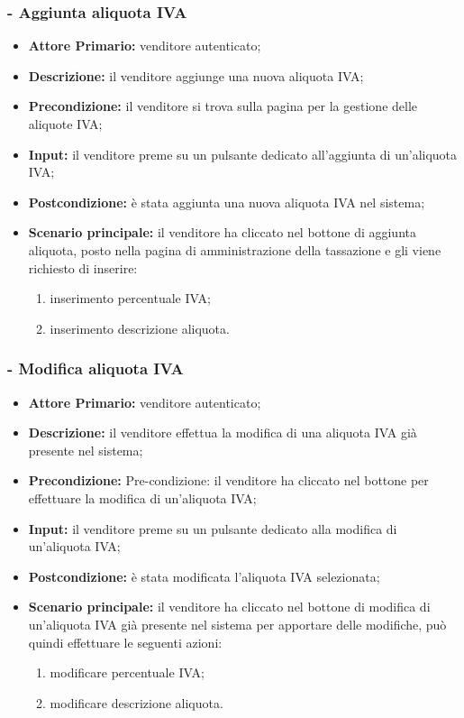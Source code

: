 \subsubsection{- Aggiunta aliquota IVA}
\begin{itemize}
    \item \textbf{Attore Primario:} venditore autenticato;
    \item \textbf{Descrizione:} il venditore aggiunge una nuova aliquota IVA;
    \item \textbf{Precondizione:} il venditore si trova sulla pagina per la gestione delle aliquote IVA;
    \item \textbf{Input:} il venditore preme su un pulsante dedicato all'aggiunta di un'aliquota IVA;
    \item \textbf{Postcondizione:} è stata aggiunta una nuova aliquota IVA nel sistema;
    \item \textbf{Scenario principale:} il venditore ha cliccato nel bottone di aggiunta aliquota, posto nella pagina di amministrazione della tassazione e gli viene richiesto di inserire:
    \begin{enumerate}
        \item inserimento percentuale IVA;
        \item inserimento descrizione aliquota.
    \end{enumerate}
\end{itemize}

\stepsubUserCase
\subsubsection{- Modifica aliquota IVA}
\begin{itemize}
    \item \textbf{Attore Primario:} venditore autenticato;
    \item \textbf{Descrizione:} il venditore effettua la modifica di una aliquota IVA già presente nel sistema;
    \item \textbf{Precondizione:} Pre-condizione: il venditore ha cliccato nel bottone per effettuare la modifica di un’aliquota IVA;
    \item \textbf{Input:} il venditore preme su un pulsante dedicato alla modifica di un'aliquota IVA;
    \item \textbf{Postcondizione:} è stata modificata l'aliquota IVA selezionata;
    \item \textbf{Scenario principale:} il venditore ha cliccato nel bottone di modifica di un’aliquota IVA già presente nel sistema per apportare delle modifiche, può quindi effettuare le seguenti azioni:
    \begin{enumerate}
        \item modificare percentuale IVA;
        \item modificare descrizione aliquota.
    \end{enumerate}
\end{itemize}

